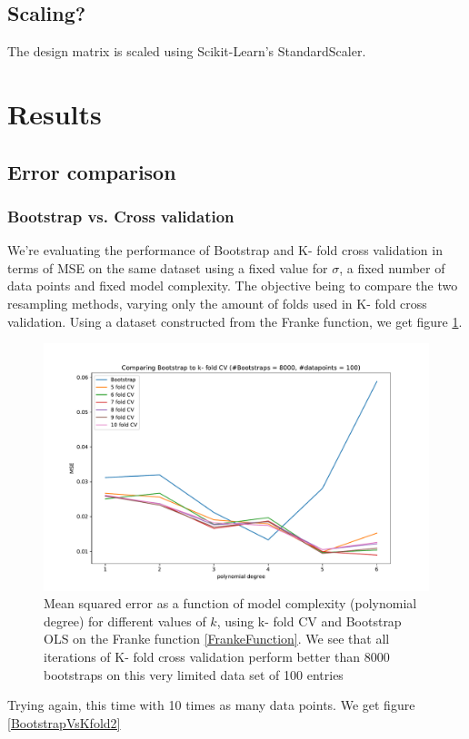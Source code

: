 \documentclass[11pt,a4paper,titlepage]{article}
\begin{document}
\subsection{Scaling?}
The design matrix is scaled using Scikit-Learn's StandardScaler.
\section{Results}
\subsection{Error comparison}
\subsubsection{Bootstrap vs. Cross validation}
We're evaluating the performance of Bootstrap and K- fold cross validation in terms of MSE on the same dataset using a fixed value for $\sigma$, a fixed number of data points and fixed model complexity. The objective being to compare the two resampling methods, varying only the amount of folds used in K- fold cross validation. Using a dataset constructed from the Franke function, we get figure \ref{BootstrapVsKfold1}.

\begin{figure}[H]
\centering

\includegraphics[trim=1.4cm 0.2cm 2.5cm 1.2cm, clip=true,scale = 0.5]{KfoldVsBootstrap_k5to10_8kBootstraps.pdf}
\caption[Comparing MSE from Bootstrap vs. K- fold CV]{Mean squared error as a function of model complexity (polynomial degree) for different values of $k$, using k- fold CV and Bootstrap OLS on the Franke function \eqref{FrankeFunction}. We see that all iterations of K- fold cross validation perform better than 8000 bootstraps on this very limited data set of 100 entries}\label{BootstrapVsKfold1}
\end{figure}
Trying again, this time with 10 times as many data points. We get figure \ref{BootstrapVsKfold2}
\end{document}

